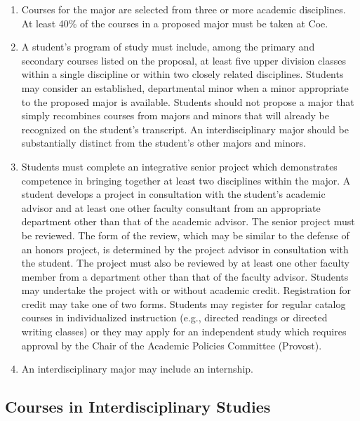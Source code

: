 \documentclass[
  letterpaper,
]{scrbook}
\providecommand{\tightlist}{%
  \setlength{\itemsep}{0pt}\setlength{\parskip}{0pt}}
\begin{document}
\begin{enumerate}
\def\labelenumi{\arabic{enumi}.}
\tightlist
\item
  Courses for the major are selected from three or more academic
  disciplines. At least 40\% of the courses in a proposed major must be
  taken at Coe.
\item
  A student's program of study must include, among the primary and
  secondary courses listed on the proposal, at least five upper division
  classes within a single discipline or within two closely related
  disciplines. Students may consider an established, departmental minor
  when a minor appropriate to the proposed major is available. Students
  should not propose a major that simply recombines courses from majors
  and minors that will already be recognized on the student's
  transcript. An interdisciplinary major should be substantially
  distinct from the student's other majors and minors.
\item
  Students must complete an integrative senior project which
  demonstrates competence in bringing together at least two disciplines
  within the major. A student develops a project in consultation with
  the student's academic advisor and at least one other faculty
  consultant from an appropriate department other than that of the
  academic advisor. The senior project must be reviewed. The form of the
  review, which may be similar to the defense of an honors project, is
  determined by the project advisor in consultation with the student.
  The project must also be reviewed by at least one other faculty member
  from a department other than that of the faculty advisor. Students may
  undertake the project with or without academic credit. Registration
  for credit may take one of two forms. Students may register for
  regular catalog courses in individualized instruction (e.g., directed
  readings or directed writing classes) or they may apply for an
  independent study which requires approval by the Chair of the Academic
  Policies Committee (Provost).
\item
  An interdisciplinary major may include an internship.
\end{enumerate}

\hypertarget{courses-in-interdisciplinary-studies}{%
\subsection{Courses in Interdisciplinary
Studies}\label{courses-in-interdisciplinary-studies}}
\end{document}
